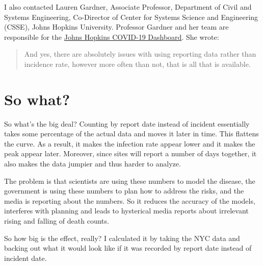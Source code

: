 \documentclass[10pt,reqno]{amsart}
\begin{document}
I also contacted Lauren Gardner, Associate Professor, Department of
Civil and Systems Engineering, Co-Director of Center for Systems
Science and Engineering (CSSE), Johns Hopkins University.  Professor
Gardner and her team are responsible for the
\href{https://coronavirus.jhu.edu/map.html}{Johns Hopkins COVID-19
  Dashboard}.  She wrote:

\begin{quotation}
  And yes, there are absolutely issues with using reporting data
  rather than incidence rate, however more often than not, that is all
  that is available.
\end{quotation}

\section{So what?}

So what's the big deal?  Counting by report date instead of incident
essentially takes some percentage of the actual data and moves it
later in time.  This flattens the curve.  As a result, it makes the
infection rate appear lower and it makes the peak appear later.
Moreover, since sites will report a number of days together, it also
makes the data jumpier and thus harder to analyze.

The problem is that scientists are using these numbers to model the
disease, the government is using these numbers to plan
how to address the risks, and the media is reporting about the
numbers.  So it reduces the accuracy of the models, interferes with
planning and leads to hysterical media reports about irrelevant rising
and falling of death counts.

So how big is the effect, really?  I calculated it by taking the NYC
data and backing out what it would look like if it was recorded by
report date instead of incident date.

\printbibliography
\end{document}

